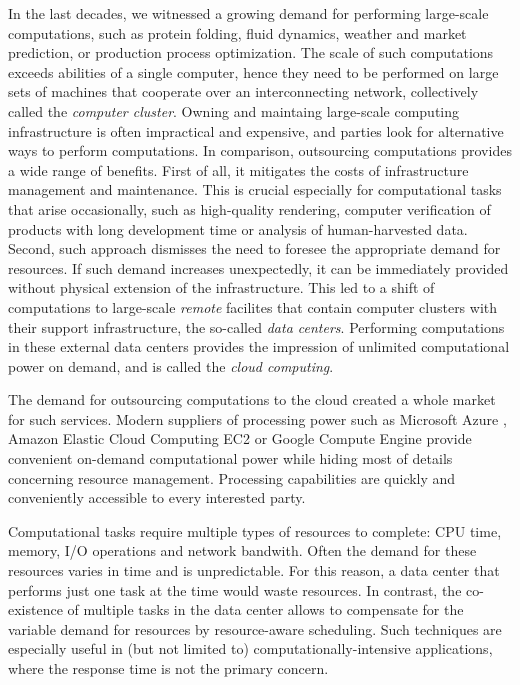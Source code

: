\indent
In the last decades, we witnessed a growing demand for performing large-scale
computations, such as protein folding, fluid dynamics, weather and market prediction, or production process optimization.
The scale of such computations exceeds abilities of a single computer, hence they need to be performed on large sets of machines that cooperate over an interconnecting network, collectively called the \emph{computer cluster}.
Owning and maintaing large-scale computing infrastructure is often impractical and expensive, and parties look for alternative ways to perform computations.
In comparison, outsourcing computations provides a wide range of benefits.
First of all, it mitigates the costs of infrastructure management and maintenance.
This is crucial especially for computational tasks that arise occasionally, such as high-quality rendering, computer verification of products with long development time or analysis of human-harvested data.
Second, such approach dismisses the need to foresee the appropriate demand for resources.
If such demand increases unexpectedly, it can be immediately provided without physical extension of the infrastructure.
This led to a shift of computations to large-scale \emph{remote} facilites that contain computer clusters with their support infrastructure, the so-called \emph{data centers}.
Performing computations in these external data centers provides the impression of unlimited computational power on demand, and is called the \emph{cloud computing}.

The demand for outsourcing computations to the cloud created a whole market for such services.
Modern suppliers of processing power such as Microsoft Azure \cite{url-azure}, Amazon Elastic Cloud Computing EC2 \cite{url-amazon-ec2} or Google Compute Engine \cite{url-gce} provide convenient on-demand computational power while hiding most of details concerning resource management.
Processing capabilities are quickly and conveniently accessible to every interested party.

Computational tasks require multiple types of resources to complete: CPU time, memory, I/O operations and network bandwith.
Often the demand for these resources varies in time and is unpredictable.
For this reason, a data center that performs just one task at the time would waste resources.
In contrast, the co-existence of multiple tasks in the data center allows to compensate for the variable demand for resources by resource-aware scheduling.
Such techniques are especially useful in (but not limited to) computationally-intensive applications, where the response time is not the primary concern.

